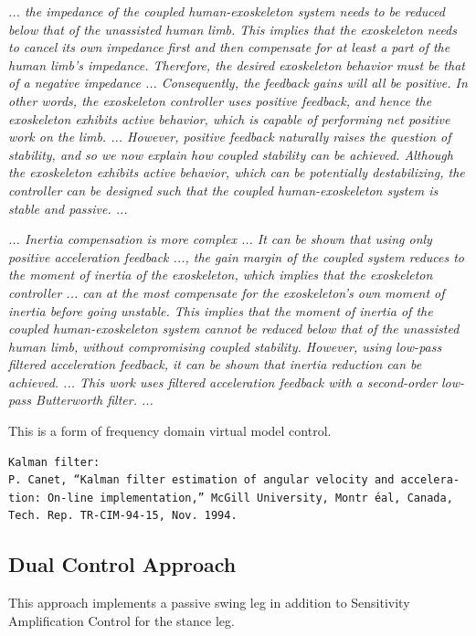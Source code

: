 \documentclass[letterpaper,12pt,fullpage]{article}
\begin{document}
{\it ... the impedance of the coupled human-exoskeleton
system needs to be reduced below that of the unassisted
human limb. This implies that the exoskeleton needs to
cancel its own impedance first and then compensate for
at least a part of the human limb’s impedance. Therefore,
the desired exoskeleton behavior must be that of a negative
impedance ... Consequently,
the feedback gains will all be
positive. In other words, the exoskeleton controller uses
positive feedback, and hence the exoskeleton exhibits active
behavior, which is capable of performing net positive work
on the limb. ...
However, positive feedback naturally raises the question of
stability, and so we now explain how coupled stability can be
achieved. Although the exoskeleton exhibits active behavior,
which can be potentially destabilizing, the controller can be
designed such that the coupled human-exoskeleton system
is stable and passive. ... 
}~\cite{Nagarajan_etal_2015}

{\it
... Inertia compensation is more complex ...
It can be shown that using only positive acceleration
feedback ..., the gain margin of the coupled system
reduces to the moment of inertia of the exoskeleton, which
implies that the exoskeleton controller ... can at the most
compensate for the exoskeleton’s own moment of inertia
before going unstable. This implies that the moment of
inertia of the coupled human-exoskeleton system cannot be
reduced below that of the unassisted human limb, without
compromising coupled stability. However, using low-pass
filtered acceleration feedback, it can be shown that inertia 
reduction can be achieved. ...
This work uses filtered acceleration
feedback with a second-order low-pass Butterworth filter. ...
}~\cite{Nagarajan_etal_2015}

This is a form of frequency domain virtual model control.

\begin{verbatim}
Kalman filter:
P. Canet, “Kalman filter estimation of angular velocity and accelera-
tion: On-line implementation,” McGill University, Montr ́eal, Canada,
Tech. Rep. TR-CIM-94-15, Nov. 1994.
\end{verbatim}

\subsection{Dual Control Approach}

This approach implements a passive swing leg in addition to Sensitivity 
Amplification Control for the stance leg.
\end{document}
